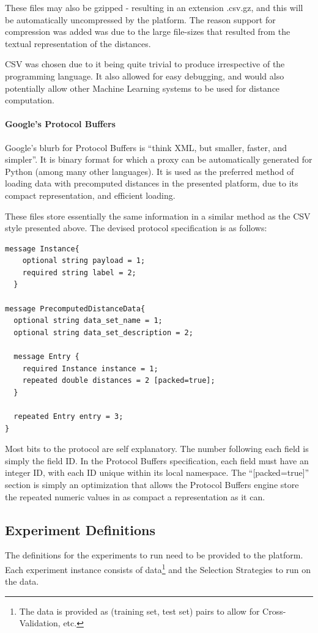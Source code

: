 \documentclass[a4paper,11pt]{report}
\begin{document}
These files may also be gzipped - resulting in an extension .csv.gz, and this will be automatically uncompressed by the platform. The reason support for compression was added was due to the large file-sizes that resulted from the textual representation of the distances.

CSV was chosen due to it being quite trivial to produce irrespective of the programming language. It also allowed for easy debugging, and would also potentially allow other Machine Learning systems to be used for distance computation.

\paragraph{Google's Protocol Buffers\cite{prog:protocolbuffers}}

Google's blurb for Protocol Buffers is ``think XML, but smaller, faster, and simpler''\cite{prog:protocolbuffers}. It is binary format for which a proxy can be automatically generated for Python (among many other languages). It is used as the preferred method of loading data with precomputed distances in the presented platform, due to its compact representation, and efficient loading.

These files store essentially the same information in a similar method as the CSV style presented above. The devised protocol specification is as follows:
\begin{verbatim}
message Instance{
    optional string payload = 1;
    required string label = 2;
  }

message PrecomputedDistanceData{
  optional string data_set_name = 1;
  optional string data_set_description = 2;
  
  message Entry {
    required Instance instance = 1;
    repeated double distances = 2 [packed=true];
  }
  
  repeated Entry entry = 3;
}
\end{verbatim}

Most bits to the protocol are self explanatory. The number following each field is simply the field ID. In the Protocol Buffers specification, each field must have an integer ID, with each ID unique within its local namespace. The ``[packed=true]'' section is simply an optimization that allows the Protocol Buffers engine store the repeated numeric values in as compact a representation as it can.


\subsection{Experiment Definitions}
The definitions for the experiments to run need to be provided to the platform. Each experiment instance consists of data\footnote{ The data is provided as (training set, test set) pairs to allow for Cross-Validation, etc.} and the Selection Strategies to run on the data.
\end{document}
